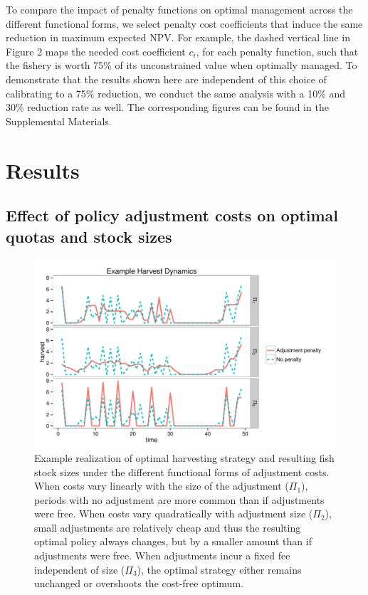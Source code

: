 \documentclass[review,12pt,author-year,titlepage]{components/elsarticle} %
\makeatletter
\def\maxwidth{\ifdim\Gin@nat@width>\linewidth\linewidth
\else\Gin@nat@width\fi}
\let\Oldincludegraphics\includegraphics
\renewcommand{\includegraphics}[1]{\Oldincludegraphics[width=\maxwidth]{#1}}
\makeatother
\begin{document}
\begin{flushleft}
To compare the impact of penalty functions on optimal management across
the different functional forms, we select penalty cost coefficients that
induce the same reduction in maximum expected NPV. For example, the
dashed vertical line in Figure 2 maps the needed cost coefficient
\(c_i\), for each penalty function, such that the fishery is worth 75\%
of its unconstrained value when optimally managed. To demonstrate that
the results shown here are independent of this choice of calibrating to
a 75\% reduction, we conduct the same analysis with a 10\% and 30\%
reduction rate as well. The corresponding figures can be found in the
Supplemental Materials.

\section{Results}\label{results}

\subsection{Effect of policy adjustment costs on optimal quotas and
stock
sizes}\label{effect-of-policy-adjustment-costs-on-optimal-quotas-and-stock-sizes}

\begin{figure}[htbp]
\centering
\includegraphics{components/figure/manuscript-Figure_3-1.pdf}
\caption{Example realization of optimal harvesting strategy and
resulting fish stock sizes under the different functional forms of
adjustment costs. When costs vary linearly with the size of the
adjustment (\(\Pi_1\)), periods with no adjustment are more common than
if adjustments were free. When costs vary quadratically with adjustment
size (\(\Pi_2\)), small adjustments are relatively cheap and thus the
resulting optimal policy always changes, but by a smaller amount than if
adjustments were free. When adjustments incur a fixed fee independent of
size (\(\Pi_3\)), the optimal strategy either remains unchanged or
overshoots the cost-free optimum.}
\end{figure}


\end{flushleft}
\end{document}
